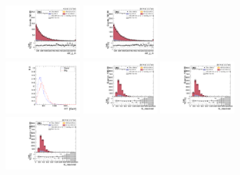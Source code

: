 \begin{figure}[!ht]
  \includegraphics[width=0.25\textwidth]{analysis_plots/2017_zjj/cr_vjets_l/vbf_jj_m.pdf} \hspace{-10pt}
  \includegraphics[width=0.25\textwidth]{analysis_plots/2018_zjj/cr_vjets_l/vbf_jj_m.pdf} \hspace{-10pt} \\
  \includegraphics[width=0.25\textwidth]{analysis_plots/tmva_plots/zjj_BDTG14_ht_resolved.pdf} \hspace{-10pt}
  \includegraphics[width=0.25\textwidth]{analysis_plots/2018_zjj/cr_vjets_l/ht_resolved.pdf} \hspace{-10pt}
  \includegraphics[width=0.25\textwidth]{analysis_plots/2018_zjj/cr_vjets_l/ht_resolved.pdf} \hspace{-10pt}
  \includegraphics[width=0.25\textwidth]{analysis_plots/2018_zjj/cr_vjets_l/ht_resolved.pdf} \hspace{-10pt} \\

\end{figure}
